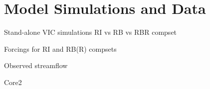 \section{Model Simulations and Data}

Stand-alone VIC simulations
RI vs RB vs RBR compset
  
  
Forcings for RI and RB(R) compsets

Observed streamflow

Core2
  